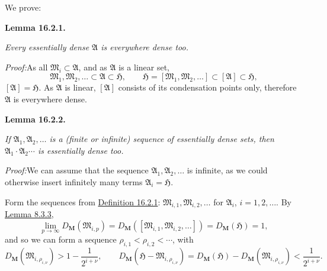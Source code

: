 \documentclass[12pt,b5paper,twoside]{article}
\newcommand{\Hspace}{\mathfrak H}
\newcommand{\M}{\mathbf M}
\newcommand{\Lemma}[1]{%
  \par\smallskip\noindent\phantomsection\label{lem:#1}\textbf{Lemma #1.}\enspace
}
\newcommand{\Proof}{\par\noindent\textit{Proof:}\enspace}
\newcommand{\defref}[1]{\hyperref[def:#1]{Definition #1}}
\newcommand{\lemref}[1]{\hyperref[lem:#1]{Lemma #1}}
\begin{document}
We prove:

\Lemma{16.2.1}
{\itshape Every essentially dense \(\mathfrak A\) is everywhere dense too.}

\Proof As all \(\mathfrak M_i\subset\mathfrak A\), and as \(\mathfrak A\)
is a linear set,
\[
\mathfrak M_1,\mathfrak M_2,\ldots\subset\mathfrak A\subset\Hspace,
\qquad
\Hspace=[\mathfrak M_1,\mathfrak M_2,\ldots]
\subset[\mathfrak A]\subset\Hspace,
\]
\([\mathfrak A]=\Hspace\). As \(\mathfrak A\) is linear,
\([\mathfrak A]\) consists of its condensation points only, therefore
\(\mathfrak A\) is everywhere dense.

\Lemma{16.2.2}
{\itshape If \(\mathfrak A_1,\mathfrak A_2,\ldots\) is a (finite or
infinite) sequence of essentially dense sets, then
\(\mathfrak A_1\cdot\mathfrak A_2\cdots\) is essentially dense too.}

\Proof We can assume that the sequence
\(\mathfrak A_1,\mathfrak A_2,\ldots\) is infinite, as we could otherwise
insert infinitely many terms \(\mathfrak A_i=\Hspace\).

Form the sequences from \defref{16.2.1}:
\(\mathfrak M_{i,1},\mathfrak M_{i,2},\ldots\) for \(\mathfrak A_i\),
\(i=1,2,\ldots\). By \lemref{8.3.3},
\[
\lim_{p\to\infty}D_{\M}(\mathfrak M_{i,p})
=D_{\M}([\mathfrak M_{i,1},\mathfrak M_{i,2},\ldots])
=D_{\M}(\Hspace)=1,
\]
and so we can form a sequence \(\rho_{i,1}<\rho_{i,2}<\cdots\), with
\[
D_{\M}(\mathfrak M_{i,\rho_{i,\nu}})>1-\frac1{2^{i+\nu}},
\qquad
D_{\M}(\Hspace-\mathfrak M_{i,\rho_{i,\nu}})
=D_{\M}(\Hspace)-D_{\M}(\mathfrak M_{i,\rho_{i,\nu}})
<\frac1{2^{i+\nu}}.
\]
\end{document}
